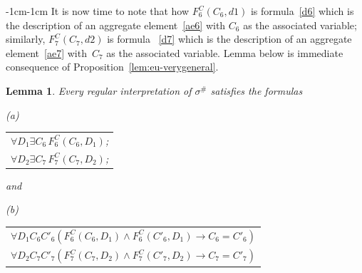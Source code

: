 \documentclass[11pt]{article}
\newtheorem{lemma}{Lemma}
\def\lrar{\leftrightarrow}
\def\ba{\begin{array}}
\def\ea{\end{array}}
\begin{document}
\begin{adjustwidth}{-1cm}{-1cm}
It is now time to note that  how $F^C_6(C_6,d1)$ is formula~\eqref{d6} which is the description of an aggregate element~\eqref{ae6} with $C_6$ as the associated variable;
similarly, $F^C_7(C_7,d2)$ is formula ~\eqref{d7} which is the description of an aggregate element~\eqref{ae7} with~$C_7$ as the associated variable.
Lemma below is immediate consequence of Proposition~\ref{lem:eu-verygeneral}.
\medskip
\begin{lemma}\label{lem:eu2}
  Every regular interpretation of $\sigma^\#$ satisfies the formulas
 \medskip
 
 (a)
  \begin{tabular}{l} 
 $\forall D_1\exists C_6\,F^C_6(C_6,D_1)$;\\  
 $\forall D_2 \exists C_7\,F^C_7(C_7,D_2)$;
  \end{tabular}

 
 \medskip\noindent and

 \medskip
 (b)
 \begin{tabular}{l} 
   $\forall D_1 C_6C'_6(F^C_6(C_6,D_1)\land F^C_6(C'_6,D_1) \to C_6=C'_6)$\\
   $\forall D_2 C_7C'_7(F^C_7(C_7,D_2)\land F^C_7(C'_7,D_2) \to C_7=C'_7)$\\ 
\end{tabular}

\end{lemma}

\end{adjustwidth}
\end{document}
